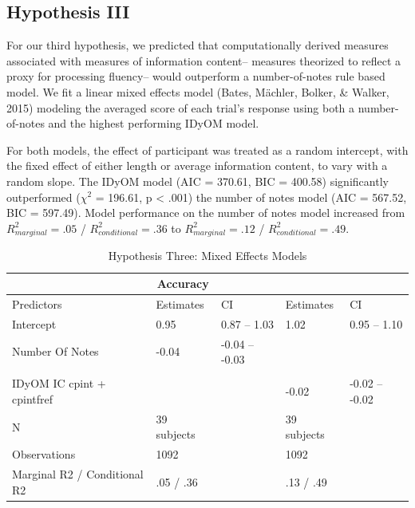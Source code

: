 \documentclass[english,man,floatsintext]{apa6}
\begin{document}
\hypertarget{hypothesis-iii}{%
\subsection{Hypothesis III}\label{hypothesis-iii}}

For our third hypothesis, we predicted that computationally derived measures associated with measures of information content-- measures theorized to reflect a proxy for processing fluency-- would outperform a number-of-notes rule based model.
We fit a linear mixed effects model (Bates, Mächler, Bolker, \& Walker, 2015) modeling the averaged score of each trial's response using both a number-of-notes and the highest performing IDyOM model.

For both models, the effect of participant was treated as a random intercept, with the fixed effect of either length or average information content, to vary with a random slope. The IDyOM model (AIC = 370.61, BIC = 400.58) significantly outperformed (\(\chi^2\) = 196.61, p \textless{} .001) the number of notes model (AIC = 567.52, BIC = 597.49).
Model performance on the number of notes model increased from \(R^2_{marginal} = .05\) / \(R^2_{conditional} = .36\) to \(R^2_{marginal} = .12\) / \(R^2_{conditional} = .49\).

\begin{table}[tbp]

\begin{center}
\begin{threeparttable}

\caption{\label{tab:unnamed-chunk-6}Hypothesis Three: Mixed Effects Models}

\begin{tabular}{lllll}
\toprule
 & \multicolumn{1}{c}{Accuracy} & \multicolumn{1}{c}{} & \multicolumn{1}{c}{} & \multicolumn{1}{c}{}\\
\midrule
Predictors & Estimates & CI & Estimates & CI\\
Intercept & 0.95 & 0.87 – 1.03 & 1.02 & 0.95 – 1.10\\
Number Of Notes & -0.04 & -0.04 – -0.03 &  & \\
 &  &  &  & \\
IDyOM IC cpint + cpintfref &  &  & -0.02 & -0.02 – -0.02\\
N & 39 subjects &  & 39 subjects & \\
Observations & 1092 &  & 1092 & \\
Marginal R2 / Conditional R2 & .05 / .36 &  & .13 / .49 & \\
\bottomrule
\end{tabular}

\end{threeparttable}
\end{center}

\end{table}
\end{document}
